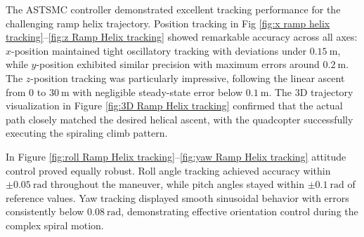 




The ASTSMC controller demonstrated excellent tracking performance for the challenging ramp helix trajectory. Position tracking in Fig \ref{fig:x ramp helix tracking}--\ref{fig:z Ramp Helix tracking} showed remarkable accuracy across all axes: $x$-position maintained tight oscillatory tracking with deviations under $0.15~\text{m}$, while $y$-position exhibited similar precision with maximum errors around $0.2~\text{m}$. The $z$-position tracking was particularly impressive, following the linear ascent from $0$ to $30~\text{m}$ with negligible steady-state error below $0.1~\text{m}$. The 3D trajectory visualization in Figure \ref{fig:3D Ramp Helix tracking} confirmed that the actual path closely matched the desired helical ascent, with the quadcopter successfully executing the spiraling climb pattern.

In Figure \ref{fig:roll Ramp Helix tracking}--\ref{fig:yaw Ramp Helix tracking} attitude control proved equally robust. Roll angle tracking achieved accuracy within $\pm 0.05~\text{rad}$ throughout the maneuver, while pitch angles stayed within $\pm 0.1~\text{rad}$ of reference values. Yaw tracking displayed smooth sinusoidal behavior with errors consistently below $0.08~\text{rad}$, demonstrating effective orientation control during the complex spiral motion.

